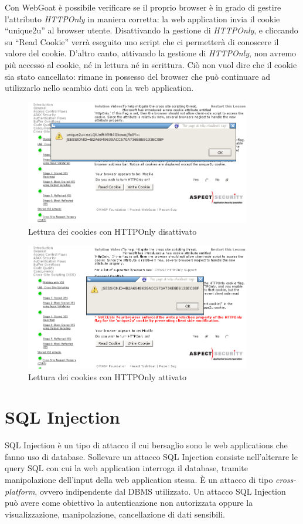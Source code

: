 \documentclass[a4paper,openright,italian]{article}
\begin{document}
Con WebGoat \`e possibile verificare se il proprio browser \`e in grado di gestire l'attributo {\it HTTPOnly} in maniera corretta: la web application invia il cookie ``unique2u'' al browser utente. Disattivando la gestione di {\it HTTPOnly}, e cliccando su ``Read Cookie'' verr\`a eseguito uno script che ci permetter\`a di conoscere il valore del cookie. D'altro canto, attivando la gestione di {\it HTTPOnly}, non avremo pi\`u accesso al cookie, n\'e in lettura n\'e in scrittura. Ci\`o non vuol dire che il cookie sia stato cancellato: rimane in possesso del browser che pu\`o continuare ad utilizzarlo nello scambio dati con la web application.
\begin{figure}[h]
\centering
\includegraphics[width=280pt]{images/xss_httponly_1.png}
\caption{Lettura dei cookies con HTTPOnly disattivato}
\end{figure}
\newline
\begin{figure}[h]
\centering
\includegraphics[width=280pt]{images/xss_httponly_2.png}
\caption{Lettura dei cookies con HTTPOnly attivato}
\end{figure}
\clearpage
\section{SQL Injection}
SQL Injection \`e un tipo di attacco il cui bersaglio sono le web applications che fanno uso di database. Sollevare un attacco SQL Injection consiste nell'alterare le query SQL con cui la web application interroga il database, tramite manipolazione dell'input della web application stessa. \`E un attacco di tipo {\it cross-platform}, ovvero indipendente dal DBMS utilizzato. Un attacco SQL Injection pu\`o avere come obiettivo la autenticazione non autorizzata oppure la visualizzazione, manipolazione, cancellazione di dati sensibili.
\end{document}

